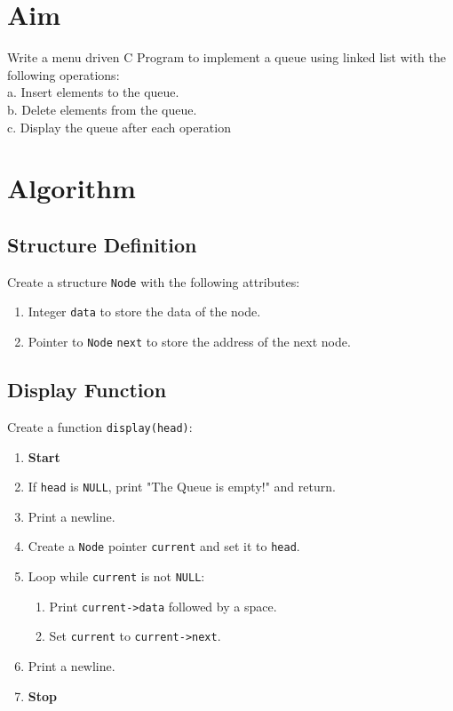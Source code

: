 
\section{Aim}
Write a menu driven C Program to implement a queue using linked list with the following
operations:
\\a. Insert elements to the queue.
\\b. Delete elements from the queue.
\\c. Display the queue after each operation

\section{Algorithm}
 {\selectfont

  \subsection{Structure Definition}
  Create a structure \texttt{Node} with the following attributes:
  \begin{enumerate}[label=\arabic*:,left=0pt]
    \item Integer \texttt{data} to store the data of the node.
    \item Pointer to \texttt{Node} \texttt{next} to store the address of the next node.
  \end{enumerate}

  \subsection{Display Function}
  Create a function \texttt{display(head)}:
  \begin{enumerate}[label=\arabic*:,left=0pt]
    \item \textbf{Start}
    \item If \texttt{head} is \texttt{NULL}, print "The Queue is empty!" and return.
    \item Print a newline.
    \item Create a \texttt{Node} pointer \texttt{current} and set it to \texttt{head}.
    \item Loop while \texttt{current} is not \texttt{NULL}:
          \begin{enumerate}[label=2.\arabic*:, start=1]
            \item Print \texttt{current->data} followed by a space.
            \item Set \texttt{current} to \texttt{current->next}.
          \end{enumerate}
    \item Print a newline.
    \item \textbf{Stop}
  \end{enumerate}

}
